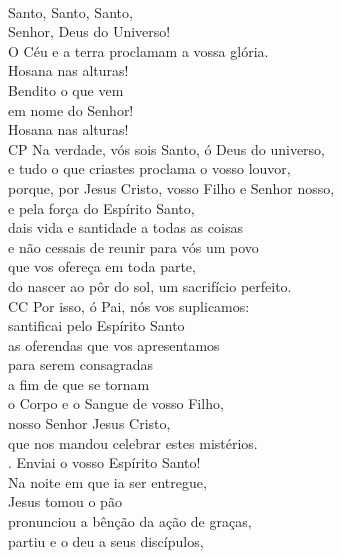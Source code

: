 \documentclass{book}
\begin{document}
\begin{flushleft}
    \vspace{.2cm} \\
    Santo, Santo, Santo, \\
    Senhor, Deus do Universo! \\
    O Céu e a terra proclamam a vossa glória. \\
    Hosana nas alturas! \\
    Bendito o que vem \\
    em nome do Senhor! \\
    Hosana nas alturas!
    \vspace{.2cm} \\
    {\color{VioletRed2}CP} Na verdade, vós sois Santo, ó Deus do universo, \\
    e tudo o que criastes proclama o vosso louvor, \\
    porque, por Jesus Cristo, vosso Filho e Senhor nosso, \\
    e pela força do Espírito Santo, \\
    dais vida e santidade a todas as coisas \\
    e não cessais de reunir para vós um povo \\
    que vos ofereça em toda parte, \\
    do nascer ao pôr do sol, um sacrifício perfeito.
    \vspace{.2cm} \\
    {\color{VioletRed2}CC} Por isso, ó Pai, nós vos suplicamos: \\
    santificai pelo Espírito Santo \\
    as oferendas que vos apresentamos \\
    para serem consagradas \\
    a fim de que se tornam \\
    o Corpo e \grecrossRed{} o Sangue de vosso Filho, \\
    nosso Senhor Jesus Cristo, \\
    que nos mandou celebrar estes mistérios.
    \vspace{.2cm} \\
    {\color{VioletRed2} \Rbar.} Enviai o vosso Espírito Santo!
    \vspace{.2cm} \\
    Na noite em que ia ser entregue, \\
    Jesus tomou o pão \\
    pronunciou a bênção da ação de graças, \\
    partiu e o deu a seus discípulos, \\

\end{flushleft}
\end{document}
